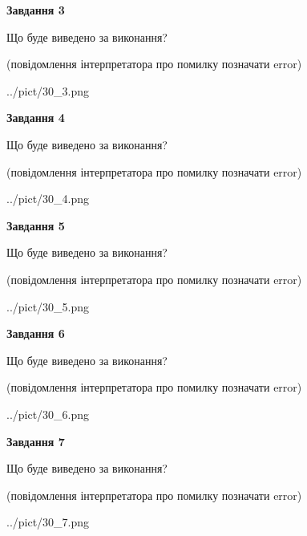 \documentclass[12pt, ukrainian]{article}
\begin{document}
{\begin {large}
{\begin {center}\textbf{Завдання 3}\end {center}}\par
Що буде виведено за виконання?\par
 (повідомлення інтерпретатора про помилку позначати error)\par
\begin{center}
	{../pict/30_3.png}
\end{center}
\newpage

{\begin {center}\textbf{Завдання 4}\end {center}}\par
Що буде виведено за виконання?\par
 (повідомлення інтерпретатора про помилку позначати error)\par
\begin{center}
	{../pict/30_4.png}
\end{center}
\newpage

{\begin {center}\textbf{Завдання 5}\end {center}}\par
Що буде виведено за виконання?\par
 (повідомлення інтерпретатора про помилку позначати error)\par
\begin{center}
	{../pict/30_5.png}
\end{center}
\newpage

{\begin {center}\textbf{Завдання 6}\end {center}}\par
Що буде виведено за виконання?\par
 (повідомлення інтерпретатора про помилку позначати error)\par
\begin{center}
	{../pict/30_6.png}
\end{center}
\newpage

{\begin {center}\textbf{Завдання 7}\end {center}}\par
Що буде виведено за виконання?\par
 (повідомлення інтерпретатора про помилку позначати error)\par
\begin{center}
	{../pict/30_7.png}
\end{center}
\newpage


\end{large}}
\end{document}
